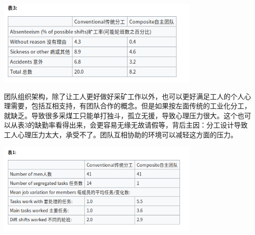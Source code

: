 
\includegraphics[width=10cm]{Screenshotfrom2022-12-2806-58-22.png}

团队组织架构，除了让工人更好做好采矿工作以外，也可以更好满足工人的个人心理需要，包括互相支持，有团队合作的概念。但是如果按左面传统的工业化分工，就缺乏。导致很多采煤工只能单打独斗，孤立无援，导致心理压力很大。这个也可以从表3的缺勤率看得出来，会更容易无缘无故请假等，背后主因：分工设计导致工人心理压力太大，承受不了。团队互相协助的环境可以减轻这方面的压力。


\includegraphics[width=10cm]{Screenshotfrom2022-12-2806-56-48.png}




